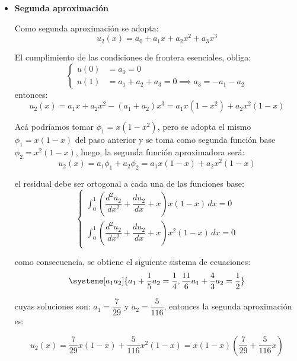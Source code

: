\begin{example}
\begin{itemize}
		\item \textbf{Segunda aproximación}
		
		Como segunda aproximación se adopta:
		\begin{equation}
			u_2(x) = a_0 + a_1x + a_2x^2 + a_3x^3
		\end{equation}
		
		El cumplimiento de las condiciones de frontera esenciales, obliga:
		\begin{equation*}
			\begin{cases}
					u(0) &= a_0 = 0\\
					u(1) &= a_1 + a_2 + a_3 = 0 \implies a_3 = -a_1 - a_2
			\end{cases}
		\end{equation*}
		entonces:
		\begin{equation*}
			u_2(x) = a_1x + a_2x^2 - (a_1 + a_2)x^3 = a_1x(1-x^2) + a_2x^2(1-x)
		\end{equation*}
		
		Acá podríamos tomar $\phi_1 = x(1-x^2)$, pero se adopta el mismo $\phi_1 = x(1-x)$ del paso anterior y se toma como segunda función base $\phi_2 = x^2(1-x)$, luego, la segunda función aproximadora será:
		\begin{equation}
			u_2(x) = a_1\phi_1 + a_2\phi_2 = a_1 x (1-x) + a_2 x^2(1-x)
		\end{equation}
		
		el residual debe ser ortogonal a cada una de las funciones base:
		\begin{equation}
			\begin{cases} \displaystyle
				\int_{0}^{1} \left(\dfrac{d^2u_2}{dx^2} + \dfrac{du_2}{dx} + x\right) x (1 - x) \, dx = 0\\[5mm] \displaystyle
				\int_{0}^{1} \left(\dfrac{d^2u_2}{dx^2} + \dfrac{du_2}{dx} + x\right) x^2 (1 - x) \, dx = 0
			\end{cases}
		\end{equation}
		
		como consecuencia, se obtiene el siguiente sistema de ecuaciones:
		\begin{equation}
			\systeme[a_1a_2]{a_1 + \frac{1}{5}a_2 = \frac{1}{4}, \frac{11}{6}a_1 + \frac{4}{3}a_2 = \frac{1}{2}}
		\end{equation}
		
		cuyas soluciones son: $a_1 = \dfrac{7}{29}$ y $a_2 = \dfrac{5}{116}$, entonces la segunda aproximación es:
		
		\begin{equation}
			u_2(x) = \dfrac{7}{29} x(1-x) + \dfrac{5}{116}x^2(1-x) = x(1-x)(\dfrac{7}{29} + \dfrac{5}{116}x)
		\end{equation}
		

\end{itemize}
\end{example}

